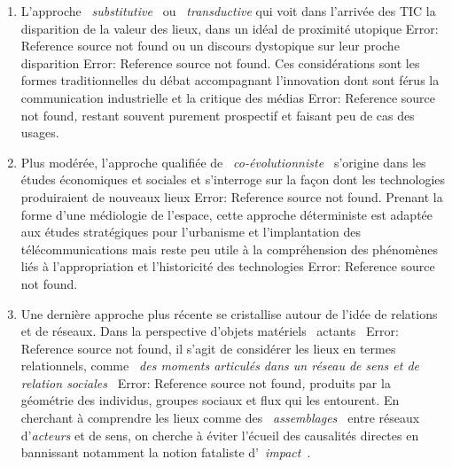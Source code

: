 \liststyleWWviiiNumiii
\begin{enumerate}
\item {\color{black}
L'approche \textit{{\guillemotleft}~substitutive~{\guillemotright}} ou \textit{{\guillemotleft}~transductive
{\guillemotright}} qui voit dans l'arriv\'ee des TIC la disparition de la valeur des lieux, dans un id\'eal de
proximit\'e utopique Error: Reference source not found\textit{ }ou un discours dystopique sur leur proche disparition
Error: Reference source not found. Ces consid\'erations sont les formes traditionnelles du d\'ebat accompagnant
l'innovation dont sont f\'erus la communication industrielle et la critique des m\'edias Error: Reference source not
found\textit{, }restant souvent purement prospectif et faisant peu de cas des usages.}
\item {\color{black}
Plus mod\'er\'ee, l'approche qualifi\'ee de \textit{{\guillemotleft}~co-\'evolutionniste~{\guillemotright} }s'origine
dans les \'etudes \'economiques et sociales et s'interroge sur la fa\c{c}on dont les technologies produiraient de
nouveaux lieux Error: Reference source not found. Prenant la forme d'une m\'ediologie de l'espace, cette approche
d\'eterministe est adapt\'ee aux \'etudes strat\'egiques pour l'urbanisme et l'implantation des t\'el\'ecommunications
mais reste peu utile \`a la compr\'ehension des ph\'enom\`enes li\'es \`a l'appropriation et l'historicit\'e des
technologies Error: Reference source not found.}
\item {\color{black}
Une derni\`ere approche plus r\'ecente se cristallise autour de l'id\'ee de relations et de r\'eseaux. Dans la
perspective d'objets mat\'eriels {\guillemotleft}~actants~{\guillemotright} Error: Reference source not found, il
s'agit de consid\'erer les lieux en termes relationnels, comme \textit{{\guillemotleft}~des moments articul\'es dans un
r\'eseau de sens et de relation sociales~{\guillemotright}} Error: Reference source not found\textit{, }produits par la
g\'eom\'etrie des individus, groupes sociaux et flux qui les entourent\textit{.} En cherchant \`a comprendre les lieux
comme des \textit{{\guillemotleft}~assemblages~{\guillemotright}} entre r\'eseaux
d'\textit{{\guillemotleft}acteurs{\guillemotright}} et de sens, on cherche \`a \'eviter l'\'ecueil des causalit\'es
directes en bannissant notamment la notion fataliste d'{\guillemotleft}~\textit{impact}~{\guillemotright}.}
\end{enumerate}

\bigskip

